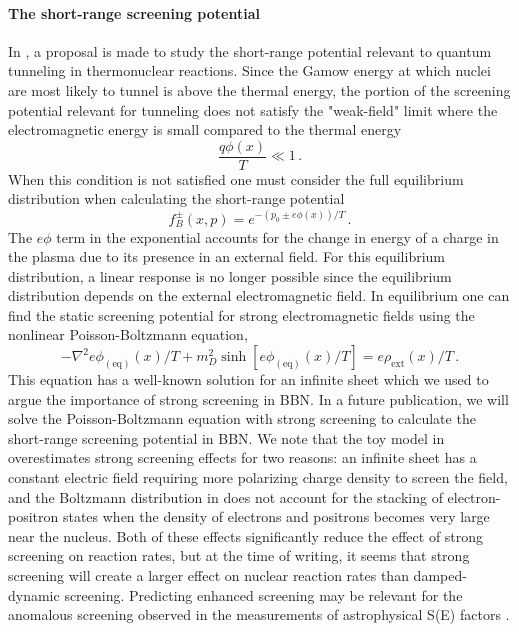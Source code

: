 \paragraph{The short-range screening potential}
In \cite{Grayson:2023flr}, a proposal is made to study the short-range potential relevant to quantum tunneling in thermonuclear reactions. Since the Gamow energy at which nuclei are most likely to tunnel is above the thermal energy, the portion of the screening potential relevant for tunneling does not satisfy the "weak-field" limit where the electromagnetic energy is small compared to the thermal energy
\begin{equation}
 \frac{q \phi(x)}{T} \ll 1\,.
\end{equation}
When this condition is not satisfied one must consider the full equilibrium distribution when calculating the short-range potential \cite{Hakim:1967prd,DeGroot:1980dk}
\begin{equation}\label{eq:Boltz}
 f_B^\pm(x,p) = e^{-(p_0\pm e\phi(x))/T}\,.
\end{equation}
The $e\phi$ term in the exponential accounts for the change in energy of a charge in the plasma due to its presence in an external field. For this equilibrium distribution, a linear response is no longer possible since the equilibrium distribution depends on the external electromagnetic field. In equilibrium one can find the static screening potential for strong electromagnetic fields using the nonlinear Poisson-Boltzmann equation,
\begin{equation}\label{eq:Poisson-Boltz}
 -\nabla^2 e\phi_{(\text{eq})}(x)/T +m_D^2\sinh\left[e\phi_{(\text{eq})}(x)/T\right] =e\rho_\mathrm{ext}(x)/T\,.
 \end{equation}
This equation has a well-known solution for an infinite sheet which we used to argue the importance of strong screening in BBN. 
In a future publication, we will solve the Poisson-Boltzmann equation with strong screening to calculate the short-range screening potential in BBN. We note that the toy model in \cite{Grayson:2023flr} overestimates strong screening effects for two reasons: an infinite sheet has a constant electric field requiring more polarizing charge density to screen the field, and the Boltzmann distribution in  does not account for the stacking of electron-positron states when the density of electrons and positrons becomes very large near the nucleus. Both of these effects significantly reduce the effect of strong screening on reaction rates, but at the time of writing, it seems that strong screening will create a larger effect on nuclear reaction rates than damped-dynamic screening. Predicting enhanced screening may be relevant for the anomalous screening observed in the measurements of astrophysical S(E) factors \cite{Zhang:2020nuc}.
 

